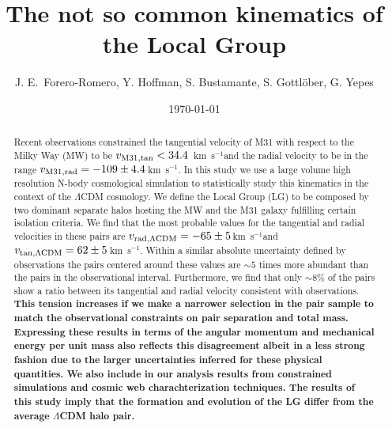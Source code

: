 \documentclass{emulateapj}
\newcommand{\kms}{\,km~s$^{-1}$}
\begin{document}
\title{The not so common kinematics of the Local Group}
\author{
J. E.\ Forero-Romero, 
Y. Hoffman, 
S.  Bustamante, 
S. Gottl\"ober, 
G. Yepes
}


\date{\today}

\begin{abstract}
   
Recent observations constrained the tangential velocity of M31 with respect to the Milky Way (MW) to be $v_{\rm M31,tan}<34.4$ \kms and the radial velocity to be in the range $v_{\rm M31,rad}=-109\pm 4.4$\kms \citep{vanderMarel12}. In this study we use a large volume high resolution N-body cosmological simulation to statistically study this kinematics in the context of the $\Lambda$CDM cosmology. We define the Local Group (LG) to be composed by two dominant separate halos hosting the MW and the M31 galaxy fulfilling certain isolation criteria. We find that the most probable values for the tangential and radial velocities in these pairs are $v_{\rm rad, \Lambda CDM}=-65\pm 5$\kms and $v_{\rm tan, \Lambda CDM}=62\pm 5$\kms. Within a similar absolute uncertainty defined by observations the pairs centered around these values are $\sim5$ times more abundant than the pairs in the observational interval. Furthermore, we find that only $\sim8\%$ of the pairs show a ratio between its tangential and radial velocity consistent with observations. {\bf This tension increases if we make a narrower selection in the pair sample to match the observational constraints on pair separation and total mass. Expressing these results in terms of the angular momentum and mechanical energy per unit mass also reflects this disagreement albeit in a less strong fashion due to the larger uncertainties inferred for these physical quantities. We also include in our analysis results from constrained simulations and cosmic web charachterization techniques. The results of this study imply that the formation and evolution of the LG differ from the average $\Lambda$CDM halo pair.}

\end{abstract}
\end{document}
